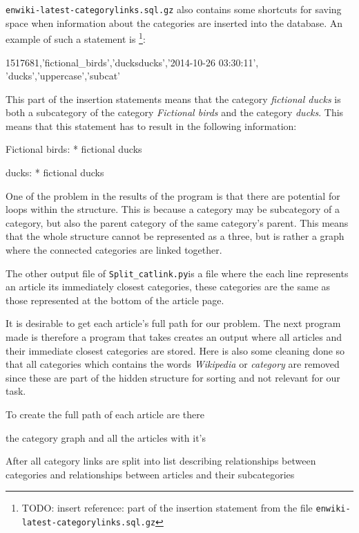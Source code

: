 \documentclass[english,a4paper]{ifimaster}
\newcommand{\enwikicatlink}{\texttt{enwiki-latest-categorylinks.sql.gz} }
\newcommand{\catlinkprogram}{\texttt{Split\_catlink.py}}
\begin{document}
\enwikicatlink also contains some shortcuts for saving space when information about the categories are inserted into the database. An example of such a statement is \footnote{TODO: insert reference: part of the insertion statement from the file \enwikicatlink}: 

\begin{code}
1517681,'fictional_birds','ducks\nfictional ducks','2014-10-26 03:30:11',
'ducks','uppercase','subcat' 
\end{code}

This part of the insertion statements means that the category \emph{fictional ducks} is both a subcategory of the category \emph{Fictional birds} and the category \emph{ducks}. This means that this statement has to result in the following information: 
\begin{code}
Fictional birds: 
* fictional ducks

ducks:
* fictional ducks
\end{code}

One of the problem in the results of the program is that there are potential for loops within the structure. This is because a category may be subcategory of a category, but also the parent category of the same category's parent. This means that the whole structure cannot be represented as a three, but is rather a graph where the connected categories are linked together. 

The other output file of \catlinkprogram is a file where the each line represents an article its immediately closest categories, these categories are the same as those represented at the bottom of the article page. 

It is desirable to get each article's full path for our problem. The next program made is therefore a program that takes creates an output where all articles and their immediate closest categories are stored. Here is also some cleaning done so that all categories which contains the words \emph{Wikipedia} or \emph{category} are removed since these are part of the hidden structure for sorting and not relevant for our task. 

To create the full path of each article are there 

the category graph and all the articles with it's 


After all category links are split into list describing relationships between categories and relationships between articles and their subcategories 
\end{document}
